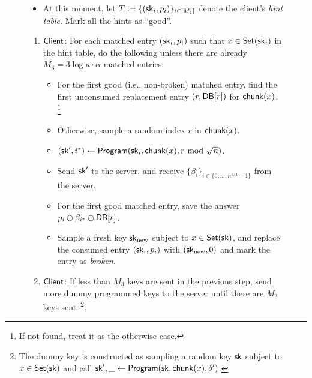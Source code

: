 \begin{figure}[p]
\begin{minipage}{\textwidth}
\begin{mdframed}
\begin{itemize}[leftmargin=3mm,itemsep=1pt]
                \item At this moment, let $T := \{({\sf sk}_i, p_i )\}_{i \in
                [M_1]}$ denote the client's {\it hint table}. Mark all the hints
                as ``good''.
            \end{itemize}
            
            
            
            
                \begin{enumerate}[leftmargin=5mm,itemsep=1pt]
\item 
${\sf Client}$:
 For each matched entry $(\mathsf{sk}_i, p_i)$ such that $x\in \mathsf{Set}(\mathsf{sk}_i)$
in the hint table, do the following unless there are already $M_3 = 3 \log \kappa \cdot \alpha$ matched entries: 
\begin{itemize}[leftmargin=4mm]
\item 
For the first good (i.e., non-broken) matched entry,  
find the first unconsumed replacement entry $(r, \mathsf{DB}[r])$ 
for $\mathsf{chunk}(x)$. \footnote{If not found, treat it as the otherwise case.}
\item 
Otherwise, sample a random index %
$r$ in $\mathsf{chunk}(x)$.
\item 
$(\mathsf{sk}', i^*)\leftarrow {\sf Program}(\mathsf{sk}_i, {\sf chunk}(x), r \text{ mod } \sqrt{n})$.
\item 
Send $\mathsf{sk}'$ to the server, and receive  
$\{\beta_i\}_{i \in \{0, \ldots, n^{1/4}-1\}}$ from the server.
\item 
For the first good matched entry, save the answer 
$p_i \oplus \beta_{i^*} \oplus \mathsf{DB}[r]$. %
\item 
Sample a fresh 
\ppps key $\mathsf{sk}_{\rm new}$ subject to $x \in \mathsf{Set}(\mathsf{sk})$, and 
replace the 
consumed entry $(\mathsf{sk}_i, p_i)$ with 
$(\mathsf{sk}_{\rm new}, 0)$
and mark the entry as {\it broken}.
\end{itemize}

\item 
${\sf Client}$:
If less than $M_3$ keys are sent in the previous step, send more dummy programmed keys to the server until there are $M_3$ keys sent~\footnote{The dummy key is constructed as sampling a random \ppps key $\mathsf{sk}$ subject to $x\in \mathsf{Set}(\mathsf{sk})$ and call $\mathsf{sk}', \_ \leftarrow {\sf Program}(\mathsf{sk}, \mathsf{chunk}(x), \delta')$.}.


\end{enumerate}
\end{mdframed}
\end{minipage}
\end{figure}
